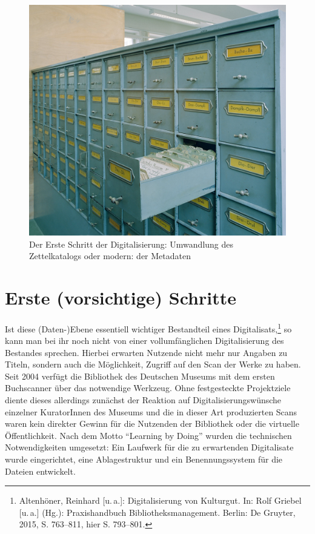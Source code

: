 \documentclass[a4paper,
fontsize=11pt,
oneside,
numbers=noperiodatend,
parskip=half-,
bibliography=totoc,
final
]{scrartcl}
\begin{document}
\begin{figure}
\centering
\includegraphics[width=.70\textwidth]{img/Abb2.jpg}
\caption{Der Erste Schritt der Digitalisierung: Umwandlung des
Zettelkatalogs oder modern: der Metadaten}
\end{figure}

\hypertarget{erste-vorsichtige-schritte}{%
\section{Erste (vorsichtige)
Schritte}\label{erste-vorsichtige-schritte}}

Ist diese (Daten-)Ebene essentiell wichtiger Bestandteil eines
Digitalisats,\footnote{Altenhöner, Reinhard {[}u.\,a.{]}: Digitalisierung
  von Kulturgut. In: Rolf Griebel {[}u.\,a.{]} (Hg.): Praxishandbuch
  Bibliotheksmanagement. Berlin: De Gruyter, 2015, S. 763--811, hier S.
  793--801.} so kann man bei ihr noch nicht von einer vollumfänglichen
Digitalisierung des Bestandes sprechen. Hierbei erwarten Nutzende nicht
mehr nur Angaben zu Titeln, sondern auch die Möglichkeit, Zugriff auf
den Scan der Werke zu haben. Seit 2004 verfügt die Bibliothek des
Deutschen Museums mit dem ersten Buchscanner über das notwendige
Werkzeug. Ohne festgesteckte Projektziele diente dieses allerdings
zunächst der Reaktion auf Digitalisierungswünsche einzelner KuratorInnen
des Museums und die in dieser Art produzierten Scans waren kein direkter
Gewinn für die Nutzenden der Bibliothek oder die virtuelle
Öffentlichkeit. Nach dem Motto \enquote{Learning by Doing} wurden die
technischen Notwendigkeiten umgesetzt: Ein Laufwerk für die zu
erwartenden Digitalisate wurde eingerichtet, eine Ablagestruktur und ein
Benennungssystem für die Dateien entwickelt.
\end{document}
